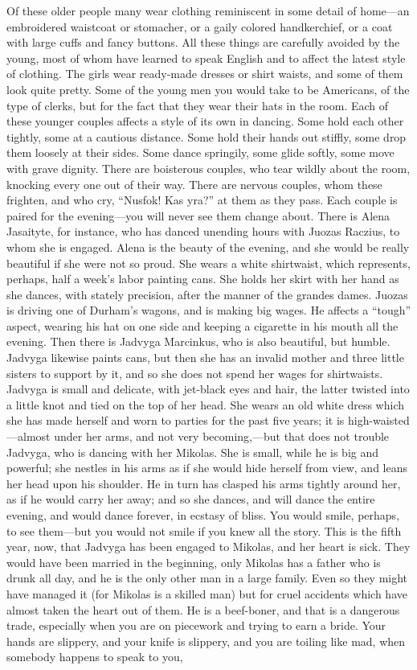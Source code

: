 \documentclass[
]{book}
\theoremstyle{definition}
\theoremstyle{definition}
\theoremstyle{definition}
\theoremstyle{definition}
\theoremstyle{remark}
\begin{document}
Of these older people many wear clothing reminiscent in some detail of home---an embroidered waistcoat or stomacher, or a gaily colored handkerchief, or a coat with large cuffs and fancy buttons. All these things are carefully avoided by the young, most of whom have learned to speak English and to affect the latest style of clothing. The girls wear ready-made dresses or shirt waists, and some of them look quite pretty. Some of the young men you would take to be Americans, of the type of clerks, but for the fact that they wear their hats in the room. Each of these younger couples affects a style of its own in dancing. Some hold each other tightly, some at a cautious distance. Some hold their hands out stiffly, some drop them loosely at their sides. Some dance springily, some glide softly, some move with grave dignity. There are boisterous couples, who tear wildly about the room, knocking every one out of their way. There are nervous couples, whom these frighten, and who cry, ``Nusfok! Kas yra?'' at them as they pass. Each couple is paired for the evening---you will never see them change about. There is Alena Jasaityte, for instance, who has danced unending hours with Juozas Raczius, to whom she is engaged. Alena is the beauty of the evening, and she would be really beautiful if she were not so proud. She wears a white shirtwaist, which represents, perhaps, half a week's labor painting cans. She holds her skirt with her hand as she dances, with stately precision, after the manner of the grandes dames. Juozas is driving one of Durham's wagons, and is making big wages. He affects a ``tough'' aspect, wearing his hat on one side and keeping a cigarette in his mouth all the evening. Then there is Jadvyga Marcinkus, who is also beautiful, but humble. Jadvyga likewise paints cans, but then she has an invalid mother and three little sisters to support by it, and so she does not spend her wages for shirtwaists. Jadvyga is small and delicate, with jet-black eyes and hair, the latter twisted into a little knot and tied on the top of her head. She wears an old white dress which she has made herself and worn to parties for the past five years; it is high-waisted---almost under her arms, and not very becoming,---but that does not trouble Jadvyga, who is dancing with her Mikolas. She is small, while he is big and powerful; she nestles in his arms as if she would hide herself from view, and leans her head upon his shoulder. He in turn has clasped his arms tightly around her, as if he would carry her away; and so she dances, and will dance the entire evening, and would dance forever, in ecstasy of bliss. You would smile, perhaps, to see them---but you would not smile if you knew all the story. This is the fifth year, now, that Jadvyga has been engaged to Mikolas, and her heart is sick. They would have been married in the beginning, only Mikolas has a father who is drunk all day, and he is the only other man in a large family. Even so they might have managed it (for Mikolas is a skilled man) but for cruel accidents which have almost taken the heart out of them. He is a beef-boner, and that is a dangerous trade, especially when you are on piecework and trying to earn a bride. Your hands are slippery, and your knife is slippery, and you are toiling like mad, when somebody happens to speak to you, 
\end{document}

